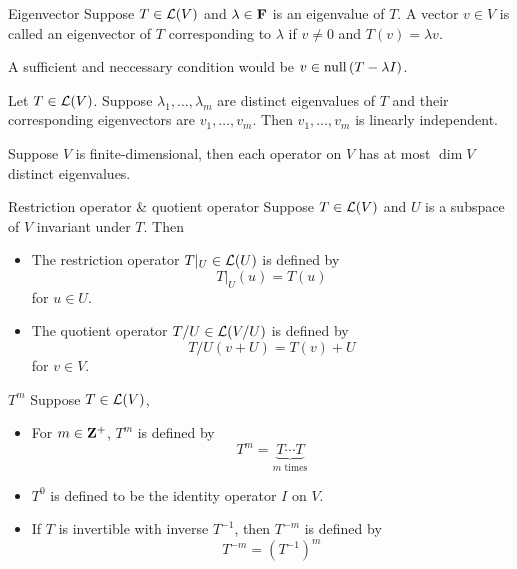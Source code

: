 \documentclass[12pt,a4paper]{article}
\begin{document}
    \begin{defi}{Eigenvector}
        Suppose $T\in\mathcal{L}(V)$ and $\lambda\in\mathbf{F}$ is an eigenvalue of $T$. A vector $v\in V$ is called an eigenvector of $T$ corresponding to $\lambda$ if $v\neq 0$ and $T(v)=\lambda v$.
    \end{defi}
    \begin{remark}
        A sufficient and neccessary condition would be $v\in\operatorname{null\,}(T-\lambda I)$.
    \end{remark}
    \hfill

    \begin{prop}\label{5.6}
        Let $T\in\mathcal{L}(V)$. Suppose $\lambda_1,\dots,\lambda_m$ are distinct eigenvalues of $T$ and their corresponding eigenvectors are $v_1,\dots,v_m$. Then $v_1,\dots,v_m$ is linearly independent.
    \end{prop}
    \begin{cor}
        Suppose $V$ is finite-dimensional, then each operator on $V$ has at most $\dim V$ distinct eigenvalues.
    \end{cor}
    \hfill

    \begin{defi}{Restriction operator \& quotient operator}
    Suppose $T\in\mathcal{L}(V)$ and $U$ is a subspace of $V$ invariant under $T$. Then
    \begin{itemize}
        \item The restriction operator $T|_{U}\in\mathcal{L}(U)$ is defined by
        $$
        T|_{U}(u)=T(u)
        $$for $u\in U$.
        \item The quotient operator $T/U\in\mathcal{L}(V/U)$ is defined by
        $$
        T/U(v+U)=T(v)+U
        $$for $v\in V$.
    \end{itemize}        
    \end{defi}
    \hfill

    \begin{defi}{$T^m$}
        Suppose $T\in\mathcal{L}(V)$,
        \begin{itemize}
            \item For $m\in\mathbf{Z}^+$, $T^m$ is defined by
            $$
            T^m=\underset{m\text{ times}}{\underbrace{T\cdots T}}
            $$
            \item $T^0$ is defined to be the identity operator $I$ on $V$.
            \item If $T$ is invertible with inverse $T^{-1}$, then $T^{-m}$ is defined by
            $$
            T^{-m}=(T^{-1})^{m}
            $$
        \end{itemize}
    \end{defi}
    \hfill
\end{document}
